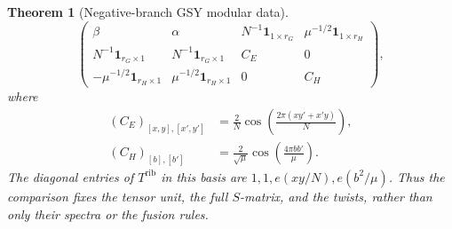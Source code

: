 \documentclass[11pt,a4paper]{article}
\numberwithin{equation}{section}
\newtheorem{theorem}{Theorem}[section]
\theoremstyle{definition}\newtheorem{definition}[theorem]{Definition}
\theoremstyle{remark}\newtheorem{remark}[theorem]{Remark}
\begin{document}
\begin{theorem}[Negative-branch GSY modular data]
\begin{equation}
\begin{pmatrix}
 \beta&\alpha&N^{-1}\mathbf1_{1\times r_G}&\mu^{-1/2}\mathbf1_{1\times r_H}\\
 N^{-1}\mathbf1_{r_G\times1}&N^{-1}\mathbf1_{r_G\times1}&C_E&0\\
 -\mu^{-1/2}\mathbf1_{r_H\times1}&\mu^{-1/2}\mathbf1_{r_H\times1}&0&C_H
 \end{pmatrix},
\end{equation}
where
\begin{align}
 (C_E)_{[x,y],[x',y']}
   &=\frac2N\cos\left(\frac{2\pi(xy'+x'y)}N\right),
                                                    \label{eq:gsy-CE}\\
 (C_H)_{[b],[b']}
   &=\frac2{\sqrt\mu}\cos\left(\frac{4\pi bb'}\mu\right).
                                                    \label{eq:gsy-CH}
\end{align}
The diagonal entries of $T^{\mathrm{rib}}$ in this basis are
$1,1,e(xy/N),e(b^2/\mu)$. Thus the comparison fixes the tensor
unit, the full $S$-matrix, and the twists, rather than only their
spectra or the fusion rules.
\end{theorem}
\end{document}
